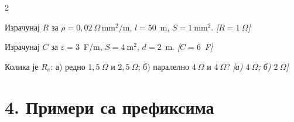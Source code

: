 \documentclass[10pt]{article}
\begin{document}
\begin{multicols}{2}
\begin{zadatak}
Израчунај $R$ за $\rho = 0{,}02~\Omega\,\text{mm}^2/\text{m}$, $l = 50$~m, $S = 1~\text{mm}^2$.
\hfill\textit{[$R = 1~\Omega$]}
\end{zadatak}

\begin{zadatak}
Израчунај $C$ за $\varepsilon = 3$~F/m, $S = 4~\text{m}^2$, $d = 2$~m.
\hfill\textit{[$C = 6$~F]}
\end{zadatak}

\begin{zadatak}
Колика је $R_e$: а) редно $1{,}5~\Omega$ и $2{,}5~\Omega$; б) паралелно $4~\Omega$ и $4~\Omega$?
\hfill\textit{[а) $4~\Omega$; б) $2~\Omega$]}
\end{zadatak}

\end{multicols}

\section*{4. Примери са префиксима}
\end{document}
